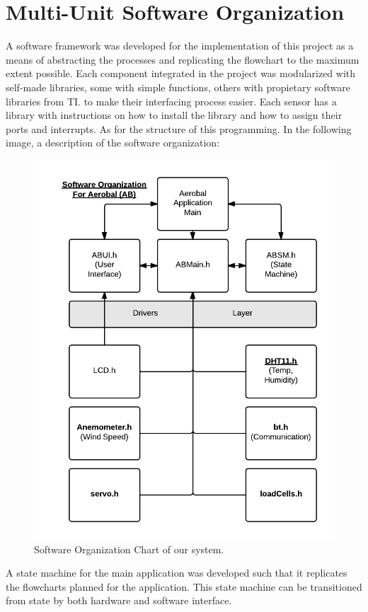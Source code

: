 \section{Multi-Unit Software Organization}

A software framework was developed for the implementation of this project as a means of abstracting the processes and replicating the flowchart to the maximum extent possible. Each component integrated in the project was modularized with self-made libraries, some with simple functions, others with propietary software libraries from TI. to make their interfacing process easier. Each sensor has a library with instructions on how to install the library and how to assign their ports and interrupts. As for the structure of this programming. In the following image, a description of the software organization:

\begin{figure}[H]
		\centering
			\includegraphics[scale=0.4]{img/organize}
		\caption{Software Organization Chart of our system.}
	\end{figure}

A state machine for the main application was developed such that it replicates the flowcharts planned for the application. This state machine can be transitioned from state by both hardware and software interface.